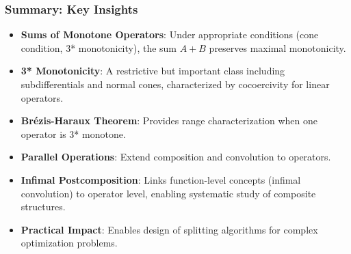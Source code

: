 \documentclass[aspectratio=169,10pt]{beamer}
\begin{document}
\begin{frame}
  \frametitle{Summary: Key Insights}

  \begin{itemize}
    \item \textbf{Sums of Monotone Operators}: Under appropriate conditions (cone condition, 3* monotonicity),
      the sum $A + B$ preserves maximal monotonicity.

    \vspace{0.25cm}

    \item \textbf{3* Monotonicity}: A restrictive but important class including subdifferentials and normal cones,
      characterized by cocoercivity for linear operators.

    \vspace{0.25cm}

    \item \textbf{Brézis-Haraux Theorem}: Provides range characterization when one operator is 3* monotone.

    \vspace{0.25cm}

    \item \textbf{Parallel Operations}: Extend composition and convolution to operators.

    \vspace{0.25cm}

    \item \textbf{Infimal Postcomposition}: Links function-level concepts (infimal convolution) to operator level,
      enabling systematic study of composite structures.

    \vspace{0.25cm}

    \item \textbf{Practical Impact}: Enables design of splitting algorithms for complex optimization problems.
  \end{itemize}

\end{frame}
\end{document}
